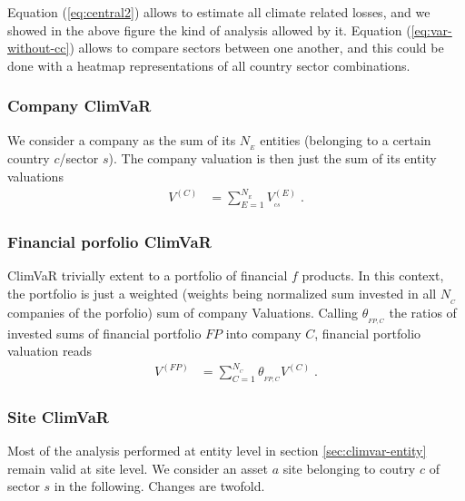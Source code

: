 Equation (\ref{eq:central2}) allows to estimate all climate related losses, and we showed in the above figure the kind of analysis allowed by it. Equation (\ref{eq:var-without-cc}) allows to compare sectors between one another, and this could be done with a heatmap representations of all country sector combinations. 



\subsubsection{Company ClimVaR}

We consider a company as the sum of its $N_{_E}$ entities (belonging to a certain country $c$/sector $s$). The company valuation is then just the sum of its entity valuations
\begin{align}
V^{(C)}&=\sum_{E=1}^{N_{_E}}V^{(E)}_{_{cs}}\;.
\end{align}

\subsubsection{Financial porfolio ClimVaR}

ClimVaR trivially extent to a portfolio of financial $f$ products. In this context, the portfolio is just a weighted (weights being normalized sum invested in all $N_{_C}$ companies of the porfolio) sum of company Valuations. Calling $\theta_{_{FP,C}}$ the ratios of invested sums of financial portfolio $FP$ into company $C$, financial portfolio valuation reads
 \begin{align}
V^{(FP)}&=\sum_{C=1}^{N_{_C}}\theta_{_{FP,C}}V^{(C)}\;.
\end{align}

\subsubsection{Site ClimVaR}

Most of the analysis performed at entity level in section \ref{sec:climvar-entity} remain valid at site level. We consider an asset $a$ site belonging to coutry $c$ of sector $s$ in the following.  Changes are twofold. 

\vspace{0.2cm}


